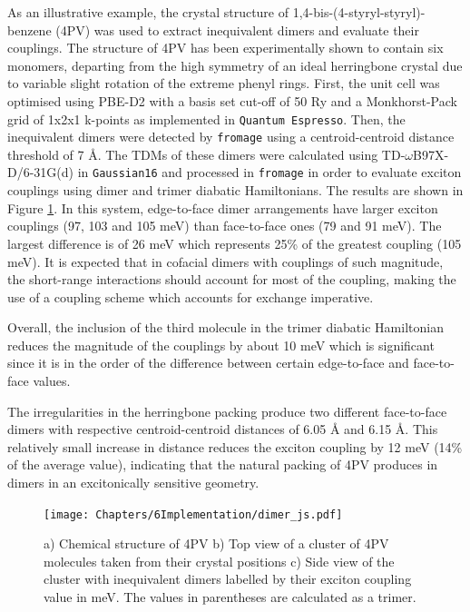 As an illustrative example, the crystal structure of 1,4-bis-(4-styryl-styryl)-benzene (4PV) was used to extract inequivalent dimers and evaluate their couplings. The structure of 4PV has been experimentally shown to contain six monomers, departing from the high symmetry of an ideal herringbone crystal due to variable slight rotation of the extreme phenyl rings.\cite{VanHutten1999} First, the unit cell was optimised using PBE-D2 with a basis set cut-off of 50 Ry and a Monkhorst-Pack grid of 1x2x1 k-points as implemented in \texttt{Quantum Espresso}.\cite{Giannozzi2009} Then, the inequivalent dimers were detected by \texttt{fromage} using a centroid-centroid distance threshold of 7 \AA. The TDMs of these dimers were calculated using TD-$\omega$B97X-D\slash{}6-31G(d) in \texttt{Gaussian16}\cite{g16} and processed in \texttt{fromage} in order to evaluate exciton couplings using dimer and trimer diabatic Hamiltonians. The results are shown in Figure \ref{fig:4pv}. In this system, edge-to-face dimer arrangements have larger exciton couplings (97, 103 and 105 meV) than face-to-face ones (79 and 91 meV). The largest difference is of 26 meV which represents 25\% of the greatest coupling (105 meV). It is expected that in cofacial dimers with couplings of such magnitude, the short-range interactions should account for most of the coupling, making the use of a coupling scheme which accounts for exchange imperative.\cite{Fornari2017}

Overall, the inclusion of the third molecule in the trimer diabatic Hamiltonian reduces the magnitude of the couplings by about 10 meV which is significant since it is in the order of the difference between certain edge-to-face and face-to-face values.

The irregularities in the herringbone packing produce two different face-to-face dimers with respective centroid-centroid distances of 6.05 \AA{} and 6.15 \AA{}. This relatively small increase in distance reduces the exciton coupling by 12 meV (14\% of the average value), indicating that the natural packing of 4PV produces in dimers in an excitonically sensitive geometry.

\begin{figure}[ht]
\centering
  \texttt{[image: Chapters/6Implementation/dimer\_js.pdf]}
  \caption{a) Chemical structure of 4PV b) Top view of a cluster of 4PV molecules taken from their crystal positions c) Side view of the cluster with inequivalent dimers labelled by their exciton coupling value in meV. The values in parentheses are calculated as a trimer.}
  \label{fig:4pv}
\end{figure}

